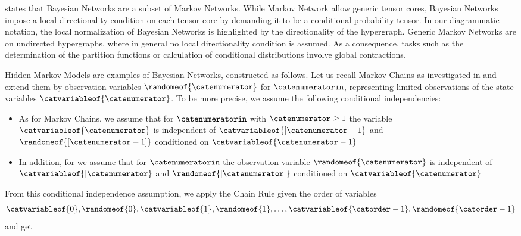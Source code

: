  states that Bayesian Networks are a subset of Markov Networks.
While Markov Network allow generic tensor cores, Bayesian Networks impose a local directionality condition on each tensor core by demanding it to be a conditional probability tensor.
In our diagrammatic notation, the local normalization of Bayesian Networks is highlighted by the directionality of the hypergraph.
Generic Markov Networks are on undirected hypergraphs, where in general no local directionality condition is assumed.
As a consequence, tasks such as the determination of the partition functions or calculation of conditional distributions involve global contractions.


\begin{example}
    Hidden Markov Models are examples of Bayesian Networks, constructed as follows.
    Let us recall Markov Chains as investigated in  and extend them by observation variables $\randomeof{\catenumerator}$ for $\catenumeratorin$, representing limited observations of the state variables $\catvariableof{\catenumerator}$.
    To be more precise, we assume the following conditional independencies:
    \begin{itemize}
        \item As for Markov Chains, we assume that for $\catenumeratorin$ with $\catenumerator\geq1$ the variable $\catvariableof{\catenumerator}$ is independent of $\catvariableof{[\catenumerator-1}$ and $\randomeof{[\catenumerator-1]}$ conditioned on $\catvariableof{\catenumerator-1}$
        \item In addition, for we assume that for $\catenumeratorin$ the observation variable $\randomeof{\catenumerator}$ is independent of $\catvariableof{[\catenumerator}$ and $\randomeof{[\catenumerator]}$ conditioned on $\catvariableof{\catenumerator}$
    \end{itemize}
    From this conditional independence assumption, we apply the Chain Rule  given the order of variables
    \begin{align*}
        \catvariableof{0},\randomeof{0},\catvariableof{1},\randomeof{1},\ldots,\catvariableof{\catorder-1},\randomeof{\catorder-1}
    \end{align*}
    and get
    \begin{align*}

\end{align*}
\end{example}
